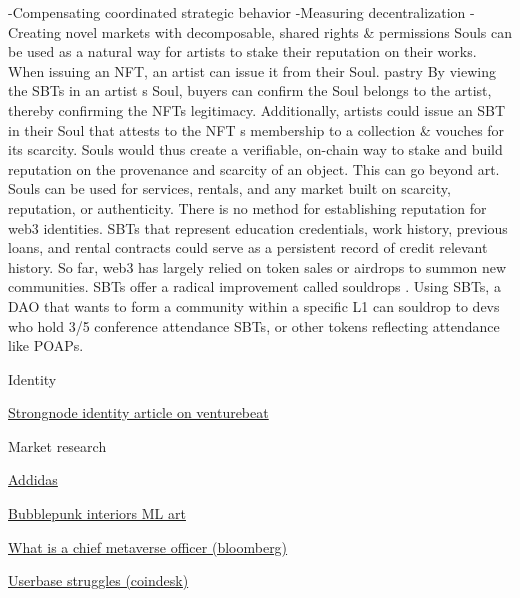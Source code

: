         -Compensating coordinated strategic behavior -Measuring
        decentralization -Creating novel markets with decomposable,
        shared rights \& permissions Souls can be used as a natural way
        for artists to stake their reputation on their works. When
        issuing an NFT, an artist can issue it from their Soul. pastry
        By viewing the SBTs in an artist s Soul, buyers can confirm the
        Soul belongs to the artist, thereby confirming the NFTs
        legitimacy. Additionally, artists could issue an SBT in their
        Soul that attests to the NFT s membership to a collection \&
        vouches for its scarcity. Souls would thus create a verifiable,
        on-chain way to stake and build reputation on the provenance and
        scarcity of an object. This can go beyond art. Souls can be used
        for services, rentals, and any market built on scarcity,
        reputation, or authenticity. There is no method for establishing
        reputation for web3 identities. SBTs that represent education
        credentials, work history, previous loans, and rental contracts
        could serve as a persistent record of credit relevant history.
        So far, web3 has largely relied on token sales or airdrops to
        summon new communities. SBTs offer a radical improvement called
        souldrops . Using SBTs, a DAO that wants to form a community
        within a specific L1 can souldrop to devs who hold 3/5
        conference attendance SBTs, or other tokens reflecting
        attendance like POAPs.
       
     
   
    Identity

     
    \tightlist
     
      \href{https://venturebeat.com/virtual/identity-in-the-metaverse-creating-a-global-identity-system/}{Strongnode
      identity article on venturebeat}
     
   
    Market research

     
    \tightlist
     
      \href{https://www.adidas.com/into_the_metaverse/mint}{Addidas}
     
      \href{https://www.bubblepunk.io/bubblepunk-interiors}{Bubblepunk
      interiors ML art}
     
      \href{https://www.bloomberg.com/news/articles/2022-09-22/what-is-a-chief-metaverse-officer-and-do-you-need-one}{What
      is a chief metaverse officer (bloomberg)}
     
      \href{https://www.coindesk.com/markets/2022/04/06/metaverse-majors-struggle-as-user-base-falls-short-of-market-expectations/?outputType=amp}{Userbase
      struggles (coindesk)}
     
